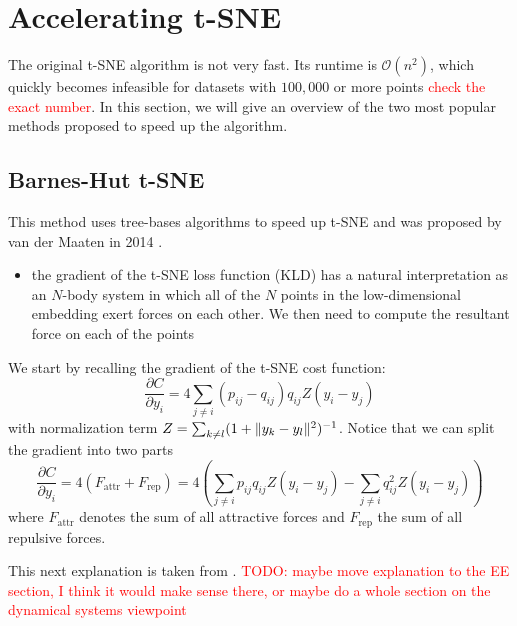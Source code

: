 \section{Accelerating t-SNE}

The original t-SNE algorithm is not very fast. Its runtime is $\mathcal{O}(n^2)$, which quickly becomes infeasible for datasets with $100,000$ or more points \textcolor{red}{check the exact number}. In this section, we will give an overview of the two most popular methods proposed to speed up the algorithm. 

\subsection{Barnes-Hut t-SNE}
This method uses tree-bases algorithms to speed up t-SNE and was proposed by van der Maaten in 2014 \cite{vdMaa14}. 

\begin{itemize}
    \item the gradient of the t-SNE loss function (KLD) has a natural interpretation as an $N$-body system in which all of the $N$ points in the low-dimensional embedding exert forces on each other. We then need to compute the resultant force on each of the points
\end{itemize}
We start by recalling the gradient of the t-SNE cost function: 
\begin{equation}
    \frac{\partial C}{\partial y_i} = 4 \sum_{j \neq i} (p_{ij} - q_{ij}) q_{ij} Z (y_i - y_j)
\end{equation}
with normalization term $Z = \sum_{k \neq l} (1+ \lVert y_k - y_l\rVert^2 )^{-1}$. Notice that we can split the gradient into two parts 
\begin{equation}
    \frac{\partial C}{\partial y_i} = 4 (F_{\text{attr}} + F_{\text{rep}}) = 4 \left( \sum_{j \neq i } p_{ij} q_{ij} Z (y_i - y_j) - \sum_{j \neq i} q_{ij}^2 Z (y_i - y_j) \right) 
\end{equation}
where $F_{\text{attr}}$ denotes the sum of all attractive forces and $F_{\text{rep}}$ the sum of all repulsive forces. 

This next explanation is taken from \cite{LinStei22}. \textcolor{red}{TODO: maybe move explanation to the EE section, I think it would make sense there, or maybe do a whole section on the dynamical systems viewpoint}

